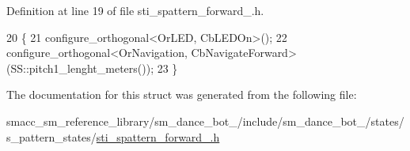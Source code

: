 Definition at line 19 of file sti\+\_\+spattern\+\_\+forward\+\_.\+h.


\begin{DoxyCode}
20   \{
21     configure\_orthogonal<OrLED, CbLEDOn>();
22     configure\_orthogonal<OrNavigation, CbNavigateForward>(SS::pitch1\_lenght\_meters());
23   \}
\end{DoxyCode}


The documentation for this struct was generated from the following file\+:\begin{DoxyCompactItemize}
\item 
smacc\+\_\+sm\+\_\+reference\+\_\+library/sm\+\_\+dance\+\_\+bot\+\_/include/sm\+\_\+dance\+\_\+bot\+\_/states/s\+\_\+pattern\+\_\+states/\hyperlink{3_2include_2sm__dance__bot__3_2states_2s__pattern__states_2sti__spattern__forward__1_8h}{sti\+\_\+spattern\+\_\+forward\+\_.\+h}\end{DoxyCompactItemize}
